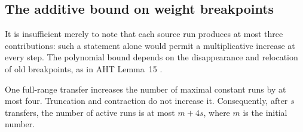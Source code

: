 \subsection{The additive bound on weight breakpoints}
\label{sec:weighted-breakpoints}

It is insufficient merely to note that each source run produces at most three
contributions: such a statement alone would permit a multiplicative increase
at every step.  The polynomial bound depends on the disappearance and
relocation of old breakpoints, as in AHT Lemma~15 \cite{AHT2006}.

\begin{lemma}
\label{lem:weighted-bands}
One full-range transfer increases the number of maximal constant runs by at
most four.  Truncation and contraction do not increase it.  Consequently,
after $s$ transfers, the number of active runs is at most $m+4s$, where $m$
is the initial number.
\end{lemma}

